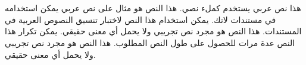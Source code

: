 \thispagestyle{plain} %
\chapter*{} %
\begin{arabtext}
	هذا نص عربي يستخدم كملء نصي. هذا النص هو مثال على نص عربي يمكن استخدامه في مستندات لاتك. يمكن استخدام هذا النص لاختبار تنسيق النصوص العربية في المستندات. هذا النص هو مجرد نص تجريبي ولا يحمل أي معنى حقيقي. يمكن تكرار هذا النص عدة مرات للحصول على طول النص المطلوب. هذا النص هو مجرد نص تجريبي ولا يحمل أي معنى حقيقي.
\end{arabtext}


\blankpage


\blindtext


\blankpage

